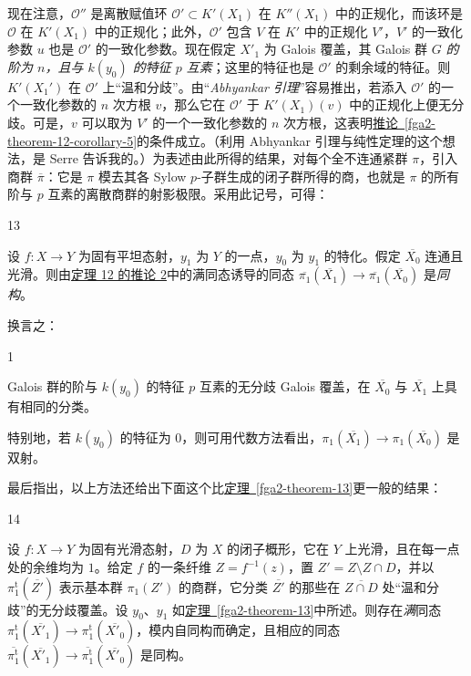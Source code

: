 \par{}现在注意，\(\mathcal {O}''\) 是离散赋值环 \(\mathcal {O}'\subset  K'(X_1)\) 在 \(K''(X_1)\) 中的正规化，而该环是 \(\mathcal {O}\) 在 \(K'(X_1)\) 中的正规化；此外，\(\mathcal {O}'\) 包含 \(V\) 在 \(K'\) 中的正规化 \(V'\)，\(V'\) 的一致化参数 \(u\) 也是 \(\mathcal {O}'\) 的一致化参数。现在假定 \(X'_1\) 为 Galois 覆盖，其 Galois 群 \(G\) \emph{的阶为 \(n\)，且与 \(k(y_0)\) 的特征 \(p\) 互素}；这里的特征也是 \(\mathcal {O}'\) 的剩余域的特征。则 \(K'(X_1')\) 在 \(\mathcal {O}'\) 上“温和分歧”。由“\emph{Abhyankar 引理}”容易推出，若添入 \(\mathcal {O}'\) 的一个一致化参数的 \(n\) 次方根 \(v\)，那么它在 \(\mathcal {O}'\) 于 \(K'(X_1)(v)\) 中的正规化上便无分歧。可是，\(v\) 可以取为 \(V'\) 的一个一致化参数的 \(n\) 次方根，这表明\hyperref[fga2-theorem-12-corollary-5]{推论~\ref*{fga2-theorem-12-corollary-5}}的条件成立。（利用 Abhyankar 引理与纯性定理的这个想法，是 Serre 告诉我的。）为表述由此所得的结果，对每个全不连通紧群 \(\pi \)，引入商群 \(\overline {\pi }\)：它是 \(\pi \) 模去其各 Sylow \(p\)-子群生成的闭子群所得的商，也就是 \(\pi \) 的所有阶与 \(p\) 互素的离散商群的射影极限。采用此记号，可得：
\begin{theorem}{13}\label{fga2-theorem-13}\skipsinglepar
\par{}设 \(f\colon  X\to  Y\) 为固有平坦态射，\(y_1\) 为 \(Y\) 的一点，\(y_0\) 为 \(y_1\) 的特化。假定 \(\overline {X_0}\) 连通且光滑。则由\hyperref[fga2-theorem-12-corollary-2]{定理 12 的推论 2}中的满同态诱导的同态 \(\overline {\pi _1}(\overline {X_1})\to \overline {\pi _1}(\overline {X_0})\) 是\emph{同构}。\end{theorem}
\par{}换言之：
\begin{corollary}{1}\label{fga2-theorem-13-corollary-1}\skipsinglepar
\par{}Galois 群的阶与 \(k(y_0)\) 的特征 \(p\) 互素的无分歧 Galois 覆盖，在 \(\overline {X_0}\) 与 \(\overline {X_1}\) 上具有相同的分类。\end{corollary}
\par{}特别地，若 \(k(y_0)\) 的特征为 \(0\)，则可用代数方法看出，\(\pi _1(\overline {X_1})\to \pi _1(\overline {X_0})\) 是双射。
\par{}最后指出，以上方法还给出下面这个比\hyperref[fga2-theorem-13]{定理~\ref*{fga2-theorem-13}}更一般的结果：
\begin{theorem}{14}\label{fga2-theorem-14}\skipsinglepar
\par{}设 \(f\colon  X\to  Y\) 为固有光滑态射，\(D\) 为 \(X\) 的闭子概形，它在 \(Y\) 上光滑，且在每一点处的余维均为 \(1\)。给定 \(f\) 的一条纤维 \(Z=f^{-1}(z)\)，置 \(Z'=Z\setminus  Z\cap  D\)，并以 \(\pi _1^\mathrm {t}(\overline {Z'})\) 表示基本群 \(\pi _1(Z')\) 的商群，它分类 \(\overline {Z'}\) 的那些在 \(\overline {Z\cap  D}\) 处“温和分歧”的无分歧覆盖。设 \(y_0\)、\(y_1\) 如\hyperref[fga2-theorem-13]{定理~\ref*{fga2-theorem-13}}中所述。则存在\emph{满}同态 \(\pi _1^\mathrm {t}(\overline {X'_1})\to \pi _1^\mathrm {t}(\overline {X'_0})\)，模内自同构而确定，且相应的同态 \(\overline {\pi _1^\mathrm {t}}(\overline {X'_1})\to \overline {\pi _1^\mathrm {t}}(\overline {X'_0})\) 是同构。\end{theorem}
